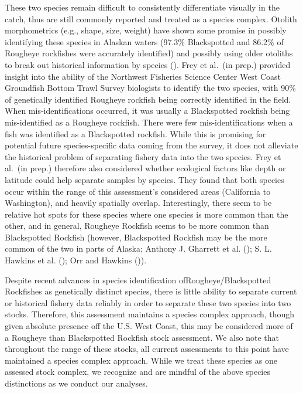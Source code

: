 \documentclass[
]{scrartcl}
\begin{document}
These two species remain difficult to consistently differentiate
visually in the catch, thus are still commonly reported and treated as a
species complex. Otolith morphometrics (e.g., shape, size, weight) have
shown some promise in possibly identifying these species in Alaskan
waters (97.3\% Blackspotted and 86.2\% of Rougheye rockfishes were
accurately identified) and possibly using older otoliths to break out
historical information by species
().
Frey et al.~(in prep.) provided insight into the ability of the
Northwest Fisheries Science Center West Coast Groundfish Bottom Trawl
Survey biologists to identify the two species, with 90\% of genetically
identified Rougheye rockfish being correctly identified in the field.
When mis-identifications occurred, it was usually a Blackspotted
rockfish being mis-identified as a Rougheye rockfish. There were few
mis-identifications when a fish was identified as a Blackspotted
rockfish. While this is promising for potential future species-specific
data coming from the survey, it does not alleviate the historical
problem of separating fishery data into the two species. Frey et al.~(in
prep.) therefore also considered whether ecological factors like depth
or latitude could help separate samples by species. They found that both
species occur within the range of this assessment's considered areas
(California to Washington), and heavily spatially overlap.
Interestingly, there seem to be relative hot spots for these species
where one species is more common than the other, and in general,
Rougheye Rockfish seems to be more common than Blackspotted Rockfish
(however, Blackspotted Rockfish may be the more common of the two in
parts of Alaska; Anthony J. Gharrett et al.
(); S. L. Hawkins et al.
(); Orr and Hawkins
()).

Despite recent advances in species identification
ofRougheye/Blackspotted Rockfishes as genetically distinct species,
there is little ability to separate current or historical fishery data
reliably in order to separate these two species into two stocks.
Therefore, this assessment maintains a species complex approach, though
given absolute presence off the U.S. West Coast, this may be considered
more of a Rougheye than Blackspotted Rockfish stock assessment. We also
note that throughout the range of these stocks, all current assessments
to this point have maintained a species complex approach. While we treat
these species as one assessed stock complex, we recognize and are
mindful of the above species distinctions as we conduct our analyses.
\end{document}
